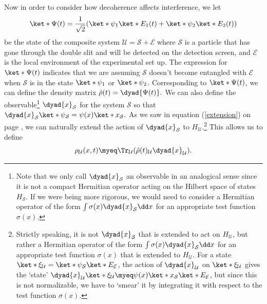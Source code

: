 \documentclass[12pt]{report}
\begin{document}
    Now in order to consider how decoherence affects interference, we let $$\ket*{\Psi(t)}=\frac{1}{\sqrt{2}}(\ket*{\psi_1}\ket*{E_1(t)}+\ket*{\psi_2}\ket*{E_2(t)})$$ be the state of the composite system $\mathcal{U}=\mathcal{S}+\mathcal{E}$ where $\mathcal{S}$ is a particle that has gone through the double slit and will be detected on the detection screen, and $\mathcal{E}$ is the local environment of the experimental set up. The expression for $\ket*{\Psi(t)}$ indicates that we are assuming  $\mathcal{S}$ doesn't become entangled with $\mathcal{E}$ when $\mathcal{S}$ is in the state $\ket*{\psi_1}$ or $\ket*{\psi_2}$. Corresponding to $\ket*{\Psi(t)}$, we can define the density matrix  $\hat{\rho}(t)=\dyad{\Psi(t)}.$  We can also define the observable\footnote{Note that we only call $\dyad{x}_\mathcal{S}$ an observable in an analogical sense since it is not a compact Hermitian operator acting on the Hilbert space of states $H_\mathcal{S}$. If we were being more rigorous, we would need to consider a Hermitian operator of the form $\int \sigma(x)\dyad{x}_\mathcal{S}\dd x$ for an appropriate test function $\sigma(x)$. } $\dyad{x}_\mathcal{S}$ for the system $\mathcal{S}$ so that $\dyad{x}_\mathcal{S}\ket*{\psi}_\mathcal{S}=\psi(x)\ket*{x}_\mathcal{S}.$ As we saw in equation (\ref{extension}) on page \pageref{extension}, we can naturally extend the action of $\dyad{x}_\mathcal{S}$ to $H_\mathcal{U}$.\footnote{Strictly speaking, it is not $\dyad{x}_\mathcal{S}$ that is extended to act on $H_\mathcal{U}$, but rather a Hermitian operator of the form $\int \sigma(x)\dyad{x}_\mathcal{S}\dd x$ for an appropriate test function $\sigma(x)$ that is extended to $H_\mathcal{U}$. For a state $\ket*{\xi}_\mathcal{U}=\ket*{\psi}_\mathcal{S}\ket*{E}_\mathcal{E}$, the action of $\dyad{x}_\mathcal{U}$ on $\ket*{\xi}_\mathcal{U}$ gives the `state' $\dyad{x}_\mathcal{U}\ket*{\xi}_\mathcal{U}\myeq\psi(x)\ket*{x}_\mathcal{S}\ket*{E}_\mathcal{E}$, but since this is not normalizable, we have to `smear' it by integrating it with respect to the test function $\sigma(x)$.}  
    This allows us to define 
    $$\rho_\mathcal{U}(x, t)\myeq\Tr_\mathcal{U}(\hat{\rho}(t)_\mathcal{U}\dyad{x}_\mathcal{U}).$$
\end{document}
